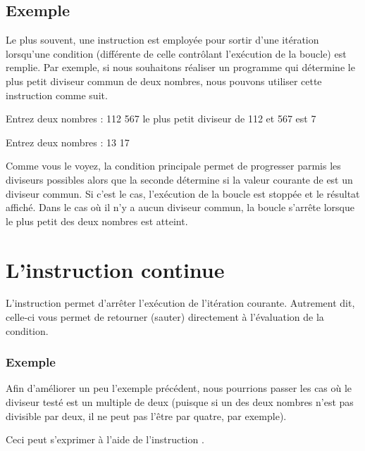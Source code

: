 \subsection{Exemple}
\label{exemple-9}

Le plus souvent, une instruction  est employée pour
sortir d'une itération lorsqu'une condition (différente de celle
contrôlant l'exécution de la boucle) est remplie. Par exemple, si nous
souhaitons réaliser un programme qui détermine le plus petit diviseur
commun de deux nombres, nous pouvons utiliser cette instruction comme
suit.

\begin{C}

\end{C}

\begin{C}
  Entrez deux nombres : 112 567 le plus petit diviseur de 112 et 567
  est 7

  Entrez deux nombres : 13 17
\end{C}

Comme vous le voyez, la condition principale permet de progresser
parmis les diviseurs possibles alors que la seconde détermine si la
valeur courante de  est un diviseur commun. Si c'est le cas,
l'exécution de la boucle est stoppée et le résultat affiché. Dans le
cas où il n'y a aucun diviseur commun, la boucle s'arrête lorsque le
plus petit des deux nombres est atteint.

\section{L’instruction continue}
\label{Linstruction-continue}

L'instruction  permet d'arrêter l'exécution de
l'itération courante. Autrement dit, celle-ci vous permet de retourner
(sauter) directement à l'évaluation de la condition.

\subsubsection*{Exemple}
\label{exemple-10}

Afin d'améliorer un peu l'exemple précédent, nous pourrions passer les
cas où le diviseur testé est un multiple de deux (puisque si un des
deux nombres n'est pas divisible par deux, il ne peut pas l'être par
quatre, par exemple).

Ceci peut s'exprimer à l'aide de l'instruction .

